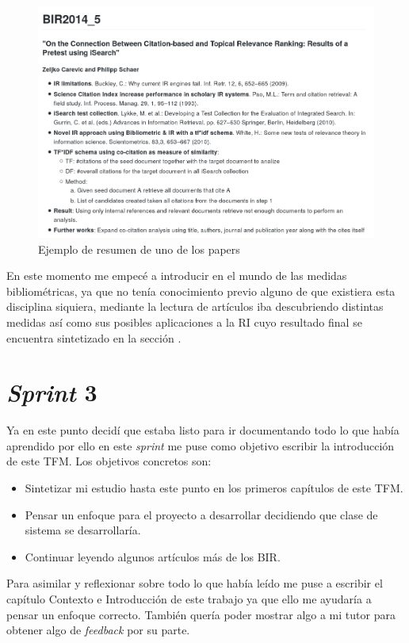 \begin{figure}[h!]
	
	\centering
	\includegraphics[width=\linewidth]{imagenes/paper_sumary}
	\caption{Ejemplo de resumen de uno de los papers}
\end{figure}

\newpage
En este momento me empecé a introducir en el mundo de las medidas bibliométricas, ya que no tenía conocimiento previo alguno de que existiera esta disciplina siquiera, mediante la lectura de artículos iba descubriendo distintas medidas así como sus posibles aplicaciones a la \acrshort{RI} cuyo resultado final se encuentra sintetizado en la sección .

\section{\textit{Sprint} 3}
Ya en este punto decidí que estaba listo para ir documentando todo lo que había aprendido por ello en este \textit{sprint} me puse como objetivo escribir la introducción de este \acrshort{TFM}. Los objetivos concretos son:
\begin{itemize}
	\item Sintetizar mi estudio hasta este punto en los primeros capítulos de este \acrshort{TFM}.
	\item Pensar un enfoque para el proyecto a desarrollar decidiendo que clase de sistema se desarrollaría.
	\item Continuar leyendo algunos artículos más de los \acrshort{BIR}.
\end{itemize}

Para asimilar y reflexionar sobre todo lo que había leído me puse a escribir el capítulo Contexto e Introducción de este trabajo ya que ello me ayudaría a pensar un enfoque correcto. También quería poder mostrar algo a mi tutor para obtener algo de \textit{feedback} por su parte.

